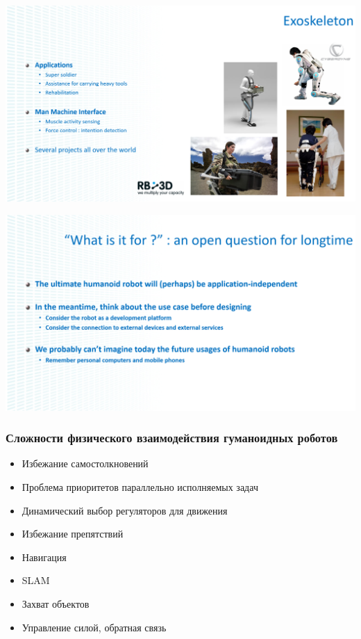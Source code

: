 \documentclass[xetex,mathserif,serif]{beamer}
\begin{document}
	\begin{frame}
		\begin{center}
			\includegraphics[width=\textwidth]{gelin13.png}
		\end{center}
	\end{frame}

	\begin{frame}
		\begin{center}
			\includegraphics[width=\textwidth]{gelin14.png}
		\end{center}
	\end{frame}

	\begin{frame}
		\frametitle{Сложности физического взаимодействия гуманоидных роботов}
		\begin{itemize}
			\item Избежание самостолкновений
			\item Проблема приоритетов параллельно исполняемых задач
			\item Динамический выбор регуляторов для движения
			\item Избежание препятствий
			\item Навигация
			\item SLAM
			\item Захват объектов
			\item Управление силой, обратная связь
		\end{itemize}
	\end{frame}
\end{document}
